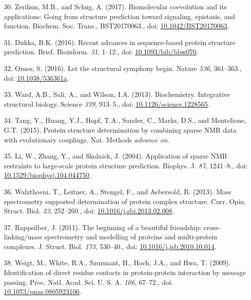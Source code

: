 \documentclass[11pt,a4paper,twoside]{book}
\theoremstyle{definition}
\theoremstyle{definition}
\theoremstyle{remark}
\begin{document}
\hypertarget{ref-Zerihun2017}{}
30. Zerihun, M.B., and Schug, A. (2017). Biomolecular coevolution and
its applications: Going from structure prediction toward signaling,
epistasis, and function. Biochem. Soc. Trans., BST20170063., doi:
\href{https://doi.org/10.1042/BST20170063}{10.1042/BST20170063}.

\hypertarget{ref-BKC2016}{}
31. Dukka, B.K. (2016). Recent advances in sequence-based protein
structure prediction. Brief. Bioinform. \emph{31}, 1--12., doi:
\href{https://doi.org/10.1093/bib/bbw070}{10.1093/bib/bbw070}.

\hypertarget{ref-Ornes2016}{}
32. Ornes, S. (2016). Let the structural symphony begin. Nature
\emph{536}, 361--363., doi:
\href{https://doi.org/10.1038/536361a}{10.1038/536361a}.

\hypertarget{ref-Ward2013}{}
33. Ward, A.B., Sali, A., and Wilson, I.A. (2013). Biochemistry.
Integrative structural biology. Science \emph{339}, 913--5., doi:
\href{https://doi.org/10.1126/science.1228565}{10.1126/science.1228565}.

\hypertarget{ref-Tang2015}{}
34. Tang, Y., Huang, Y.J., Hopf, T.A., Sander, C., Marks, D.S., and
Montelione, G.T. (2015). Protein structure determination by combining
sparse NMR data with evolutionary couplings. Nat. Methods \emph{advance
on}.

\hypertarget{ref-Li2004}{}
35. Li, W., Zhang, Y., and Skolnick, J. (2004). Application of sparse
NMR restraints to large-scale protein structure prediction. Biophys. J.
\emph{87}, 1241--8., doi:
\href{https://doi.org/10.1529/biophysj.104.044750}{10.1529/biophysj.104.044750}.

\hypertarget{ref-Walzthoeni2013}{}
36. Walzthoeni, T., Leitner, A., Stengel, F., and Aebersold, R. (2013).
Mass spectrometry supported determination of protein complex structure.
Curr. Opin. Struct. Biol. \emph{23}, 252--260., doi:
\href{https://doi.org/10.1016/j.sbi.2013.02.008}{10.1016/j.sbi.2013.02.008}.

\hypertarget{ref-Rappsilber2011}{}
37. Rappsilber, J. (2011). The beginning of a beautiful friendship:
cross-linking/mass spectrometry and modelling of proteins and
multi-protein complexes. J. Struct. Biol. \emph{173}, 530--40., doi:
\href{https://doi.org/10.1016/j.jsb.2010.10.014}{10.1016/j.jsb.2010.10.014}.

\hypertarget{ref-Weigt2009}{}
38. Weigt, M., White, R.A., Szurmant, H., Hoch, J.A., and Hwa, T.
(2009). Identification of direct residue contacts in protein-protein
interaction by message passing. Proc. Natl. Acad. Sci. U. S. A.
\emph{106}, 67--72., doi:
\href{https://doi.org/10.1073/pnas.0805923106}{10.1073/pnas.0805923106}.
\end{document}
